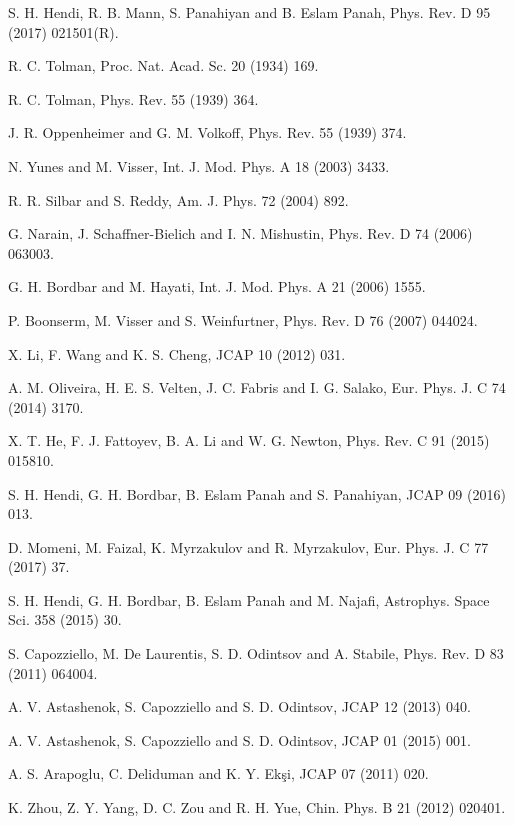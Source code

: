 \documentclass[aps]{revtex4}
\begin{document}
\begin{thebibliography}{999}
 S. H. Hendi, R. B. Mann, S. Panahiyan and B. Eslam Panah, Phys.
Rev. D 95 (2017) 021501(R).

 R. C. Tolman, Proc. Nat. Acad. Sc. 20 (1934) 169.

 R. C. Tolman, Phys. Rev. 55 (1939) 364.

 J. R. Oppenheimer and G. M. Volkoff, Phys. Rev. 55
(1939) 374.

 N. Yunes and M. Visser, Int. J. Mod. Phys. A 18 (2003) 3433.

 R. R. Silbar and S. Reddy, Am. J. Phys. 72 (2004) 892.

 G. Narain, J. Schaffner-Bielich and I. N. Mishustin,
Phys. Rev. D 74 (2006) 063003.

 G. H. Bordbar and M. Hayati, Int. J. Mod. Phys. A 21
(2006) 1555.

 P. Boonserm, M. Visser and S. Weinfurtner, Phys. Rev. D
76 (2007) 044024.

 X. Li, F. Wang and K. S. Cheng, JCAP 10 (2012) 031.

 A. M. Oliveira, H. E. S. Velten, J. C. Fabris and I.
G. Salako, Eur. Phys. J. C 74 (2014) 3170.

 X. T. He, F. J. Fattoyev, B. A. Li and W. G. Newton, Phys.
Rev. C 91 (2015) 015810.

 S. H. Hendi, G. H. Bordbar, B. Eslam Panah and S.
Panahiyan, JCAP 09 (2016) 013.

 D. Momeni, M. Faizal, K. Myrzakulov and R. Myrzakulov, Eur. Phys. J. C 77 (2017) 37.

 S. H. Hendi, G. H. Bordbar, B. Eslam Panah and M.
Najafi, Astrophys. Space Sci. 358 (2015) 30.

 S. Capozziello, M. De Laurentis, S. D. Odintsov
and A. Stabile, Phys. Rev. D 83 (2011) 064004.

 A. V. Astashenok, S. Capozziello and S. D. Odintsov,
JCAP 12 (2013) 040.

 A. V. Astashenok, S. Capozziello and S. D.
Odintsov, JCAP 01 (2015) 001.

 A. S. Arapoglu, C. Deliduman and K. Y. Ek\c{s}i, JCAP 07
(2011) 020.

 K. Zhou, Z. Y. Yang, D. C. Zou and R. H. Yue, Chin. Phys.
B 21 (2012) 020401.


\end{thebibliography}
\end{document}
